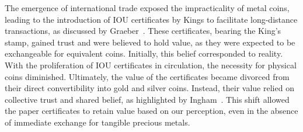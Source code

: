 The emergence of international trade exposed the impracticality of metal coins, leading to the introduction of IOU certificates by Kings to
facilitate long-distance transactions, as discussed by Graeber~\cite{graeber2011}. These certificates, bearing the King's stamp, gained trust
and were believed to hold value, as they were expected to be exchangeable for equivalent coins. Initially, this belief corresponded to reality.
With the proliferation of IOU certificates in circulation, the necessity for physical coins diminished. Ultimately, the value of the certificates
became divorced from their direct convertibility into gold and silver coins. Instead, their value relied on collective trust and shared belief,
as highlighted by Ingham~\cite{ingham2004}. This shift allowed the paper certificates to retain value based on our perception, even in the
absence of immediate exchange for tangible precious metals.
